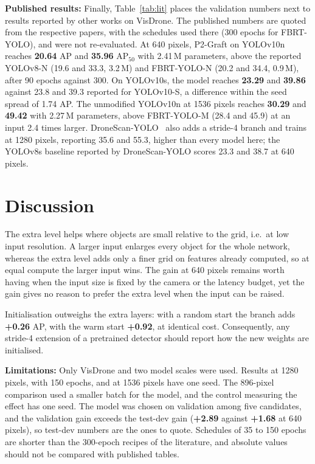 \documentclass[runningheads]{llncs}
\begin{document}
\textbf{Published results:} Finally, Table~\ref{tab:lit} places the validation numbers next to results reported by other works on VisDrone. The published numbers are quoted from the respective papers, with the schedules used there (300 epochs for FBRT-YOLO), and were not re-evaluated. At 640 pixels, P2-Graft on YOLOv10n reaches \textbf{20.64} AP and \textbf{35.96} AP$_{50}$ with 2.41\,M parameters, above the reported YOLOv8-N (19.6 and 33.3, 3.2\,M) and FBRT-YOLO-N (20.2 and 34.4, 0.9\,M), after 90 epochs against 300. On YOLOv10s, the model reaches \textbf{23.29} and \textbf{39.86} against 23.8 and 39.3 reported for YOLOv10-S, a difference within the seed spread of 1.74 AP. The unmodified YOLOv10n at 1536 pixels reaches \textbf{30.29} and \textbf{49.42} with 2.27\,M parameters, above FBRT-YOLO-M (28.4 and 45.9) at an input 2.4 times larger. DroneScan-YOLO~\cite{bellec2026dronescan} also adds a stride-4 branch and trains at 1280 pixels, reporting 35.6 and 55.3, higher than every model here; the YOLOv8s baseline reported by DroneScan-YOLO scores 23.3 and 38.7 at 640 pixels.

\begin{table}[H]
\centering\small
\caption{Published validation results on VisDrone against the models of the study (bold, 90 epochs).}
\label{tab:lit}

\end{table}

\section{Discussion}
The extra level helps where objects are small relative to the grid, i.e.\ at low input resolution. A larger input enlarges every object for the whole network, whereas the extra level adds only a finer grid on features already computed, so at equal compute the larger input wins. The gain at 640 pixels remains worth having when the input size is fixed by the camera or the latency budget, yet the gain gives no reason to prefer the extra level when the input can be raised.

Initialisation outweighs the extra layers: with a random start the branch adds \textbf{+0.26} AP, with the warm start \textbf{+0.92}, at identical cost. Consequently, any stride-4 extension of a pretrained detector should report how the new weights are initialised.

\textbf{Limitations:} Only VisDrone and two model scales were used. Results at 1280 pixels, with 150 epochs, and at 1536 pixels have one seed. The 896-pixel comparison used a smaller batch for the model, and the control measuring the effect has one seed. The model was chosen on validation among five candidates, and the validation gain exceeds the test-dev gain (\textbf{+2.89} against \textbf{+1.68} at 640 pixels), so test-dev numbers are the ones to quote. Schedules of 35 to 150 epochs are shorter than the 300-epoch recipes of the literature, and absolute values should not be compared with published tables.
\end{document}
